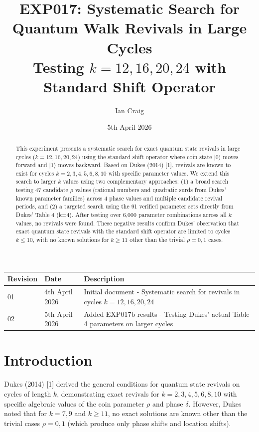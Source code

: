 \documentclass[12pt]{article}
\title{EXP017: Systematic Search for Quantum Walk Revivals in Large Cycles \\
       \large Testing $k = 12, 16, 20, 24$ with Standard Shift Operator}
\author{Ian Craig}
\date{5th April 2026}
\begin{document}
\maketitle

\begin{table}[H]
\centering
\begin{tabular}{|l|l|p{10cm}|}
\hline
Revision & Date & Description \\
\hline
01 & 4th April 2026 & Initial document - Systematic search for revivals in cycles $k=12,16,20,24$ \\
02 & 5th April 2026 & Added EXP017b results - Testing Dukes' actual Table 4 parameters on larger cycles \\
\hline
\end{tabular}
\end{table}

\begin{abstract}
This experiment presents a systematic search for exact quantum state revivals in large cycles ($k = 12, 16, 20, 24$) using the standard shift operator where coin state $|0\rangle$ moves forward and $|1\rangle$ moves backward. Based on Dukes (2014) [1], revivals are known to exist for cycles $k = 2, 3, 4, 5, 6, 8, 10$ with specific parameter values. We extend this search to larger $k$ values using two complementary approaches: (1) a broad search testing 47 candidate $\rho$ values (rational numbers and quadratic surds from Dukes' known parameter families) across 4 phase values and multiple candidate revival periods, and (2) a targeted search using the 91 verified parameter sets directly from Dukes' Table 4 (k=4). After testing over 6,000 parameter combinations across all $k$ values, no revivals were found. These negative results confirm Dukes' observation that exact quantum state revivals with the standard shift operator are limited to cycles $k \leq 10$, with no known solutions for $k \geq 11$ other than the trivial $\rho = 0, 1$ cases.
\end{abstract}

\section{Introduction}

Dukes (2014) [1] derived the general conditions for quantum state revivals on cycles of length $k$, demonstrating exact revivals for $k = 2, 3, 4, 5, 6, 8, 10$ with specific algebraic values of the coin parameter $\rho$ and phase $\delta$. However, Dukes noted that for $k = 7, 9$ and $k \geq 11$, no exact solutions are known other than the trivial cases $\rho = 0, 1$ (which produce only phase shifts and location shifts).
\end{document}
